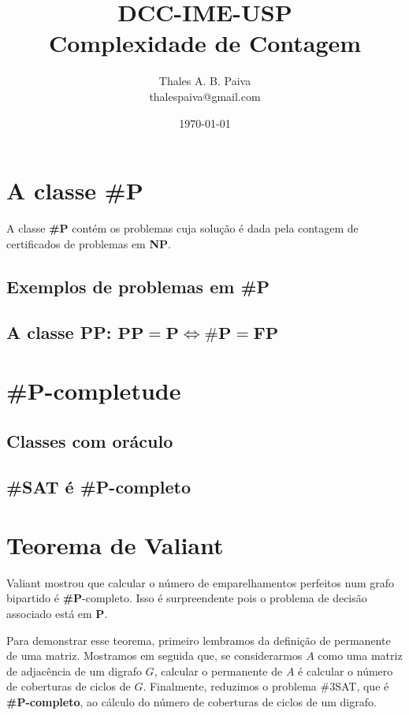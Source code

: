 \documentclass[paper=a4, fontsize=11pt]{scrartcl} %
\title{	
\normalfont \normalsize 
\textsc{DCC-IME-USP} \\ [25pt] %
\huge Complexidade de Contagem \\ %
}
\author{Thales A. B. Paiva \\ thalespaiva@gmail.com} %
\date{\normalsize\today} %
\renewcommand{\P}{\textbf{P}\xspace}
\newcommand{\SP}{\textbf{\#P}\xspace}
\newcommand{\NP}{\textbf{NP}\xspace}
\newcommand{\FP}{\textbf{FP}\xspace}
\newcommand{\PP}{\textbf{PP}\xspace}
\newcommand{\SPc}{\textbf{\#P-completo}\xspace}
\newcommand{\prob}[1]{\textsc{\textbf{#1}}}
\begin{document}
\maketitle %
\tableofcontents



\pagebreak
\section{A classe \SP}

A classe \SP contém os problemas cuja solução é dada pela contagem de certificados de problemas em \NP.

\subsection{Exemplos de problemas em \SP}

\subsection{A classe \PP: $ \PP = \P \iff \SP = \FP $}

\pagebreak
\section{\SP-completude}

\subsection{Classes com oráculo}
\subsection{\prob{\#SAT} é \SPc}


\pagebreak
\section{Teorema de Valiant}

Valiant mostrou que calcular o número de emparelhamentos perfeitos num grafo bipartido é \SP-completo. Isso é surpreendente pois o problema de decisão associado está em \P. 

Para demonstrar esse teorema, primeiro lembramos da definição de permanente de uma matriz. Mostramos em seguida que, se considerarmos $A$ como uma matriz de adjacência de um digrafo $G$, calcular o permanente de $A$ é calcular o número de coberturas de ciclos de $G$. Finalmente, reduzimos o problema \#3SAT, que é \SPc, ao cálculo do número de coberturas de ciclos de um digrafo.
\end{document}

